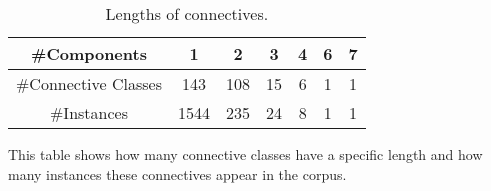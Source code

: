 \begin{table}[!htbp]
\centering
\begin{tabular}{|c|c|c|c|c|c|c|}
\hline
\#Components         & 1    & 2   & 3  & 4 & 6 & 7 \\ \hline
\#Connective Classes & 143  & 108 & 15 & 6 & 1 & 1 \\ \hline
\#Instances          & 1544 & 235 & 24 & 8 & 1 & 1 \\ \hline
\end{tabular}
\caption{\label{t:connective-length} Lengths of connectives.}
This table shows how many connective classes have a specific length
and how many instances these connectives appear in the corpus.
\end{table}
